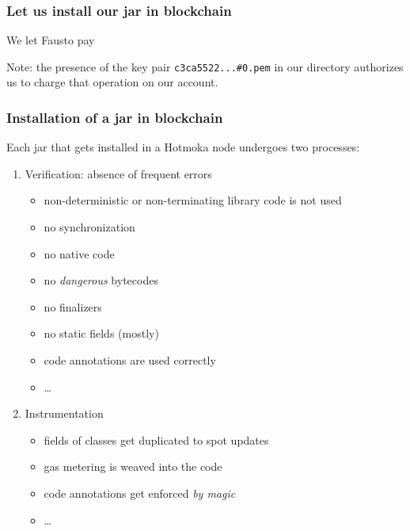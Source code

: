 \documentclass[11pt]{beamer}  %
\def\codesize{\smaller}
\def\<#1>{\codeid{#1}}
\newcommand{\codeid}[1]{\ifmmode{\mbox{\codesize\ttfamily{#1}}}\else{\codesize\ttfamily #1}\fi}
\begin{document}
\begin{frame}[fragile]\frametitle{Let us install our jar in blockchain}

  \begin{greenbox}{We let Fausto pay}
{\small{}}

  Note: the presence of the key pair \texttt{c3ca5522...\#0.pem} in
  our directory authorizes us to charge that operation on our account.
  \end{greenbox}

\end{frame}

\begin{frame}\frametitle{Installation of a jar in blockchain}

  Each jar that gets installed in a Hotmoka node undergoes two processes:

  \begin{enumerate}
  \item Verification: absence of frequent errors
    \begin{itemize}
    \item non-deterministic or non-terminating library code is not used
    \item no synchronization
    \item no native code
    \item no \emph{dangerous} bytecodes
    \item no finalizers
    \item no static fields (mostly)
    \item code annotations are used correctly
    \item \ldots
    \end{itemize}
  \item Instrumentation
    \begin{itemize}
    \item fields of \<Storage> classes get duplicated to spot updates
    \item gas metering is weaved into the code
    \item code annotations get enforced \emph{by magic}
    \item \ldots
    \end{itemize}
  \end{enumerate}

\end{frame}
\end{document}
